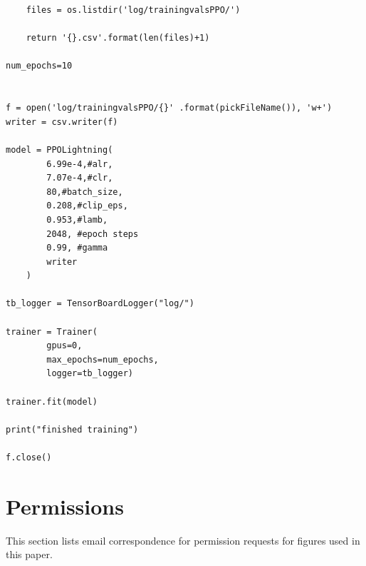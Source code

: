 \documentclass[12pt]{article}
\begin{document}
\begin{addmargin}[-4em]{-4em}
\begin{multicols}{2}
\begin{verbatim}
    files = os.listdir('log/trainingvalsPPO/')

    return '{}.csv'.format(len(files)+1)

num_epochs=10


f = open('log/trainingvalsPPO/{}' .format(pickFileName()), 'w+')
writer = csv.writer(f)

model = PPOLightning(
        6.99e-4,#alr,
        7.07e-4,#clr,
        80,#batch_size,
        0.208,#clip_eps,
        0.953,#lamb,
        2048, #epoch steps
        0.99, #gamma
        writer
    )

tb_logger = TensorBoardLogger("log/")

trainer = Trainer(
        gpus=0,
        max_epochs=num_epochs,
        logger=tb_logger)

trainer.fit(model)

print("finished training")

f.close()
\end{verbatim}
\end{multicols}

\end{addmargin}
\newpage
\section{Permissions}
This section lists email correspondence for permission requests for figures used in this paper. \\\newline
\end{document}

